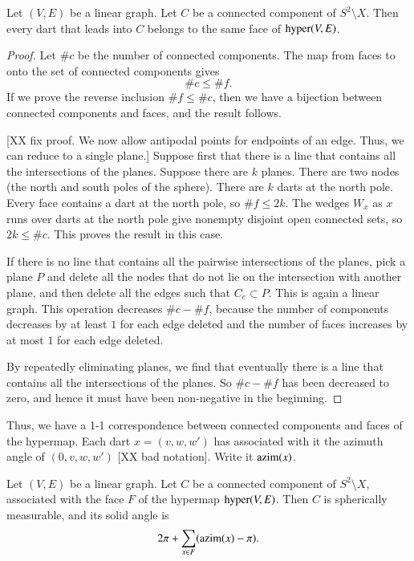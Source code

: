 \begin{lemma}  Let $(V,E)$ be a linear graph.  Let $C$ be a
connected component of $S^2\setminus X$.  Then every dart that leads
into $C$ belongs to the same face of ${\operatorname{hyper}}(V,E)$.
\end{lemma}

\begin{proof}  Let $\#c$ be the number of connected components.  The
map from faces to onto the set of connected components gives
        $$\#c \le \#f.$$
If we prove the reverse inclusion $\#f \le \#c$, then we have a
bijection between connected components and faces, and the result
follows.


[XX fix proof. We now allow antipodal points for endpoints of an
edge.  Thus, we can reduce to a single plane.] Suppose first that
there is a line that contains all the intersections of the planes.
Suppose there are $k$ planes. There are two nodes (the north and
south poles of the sphere). There are $k$ darts at the north pole.
Every face contains a dart at the north pole, so $\#f \le 2 k$. The
wedges $W_x$ as $x$ runs over darts at the north pole give nonempty
disjoint open connected sets, so $2 k \le \#c$.  This proves the
result in this case.

If there is no line that contains all the pairwise intersections of
the planes, pick a plane $P$ and delete all the nodes that do not
lie on the intersection with another plane, and then delete all the
edges such that $C_e\subset P$.  This is again a linear graph. This
operation decreases $\#c - \#f$, because the number of components
decreases by at least $1$ for each edge deleted and the number of
faces increases by at most $1$ for each edge deleted.

By repeatedly eliminating planes, we find that eventually there is a
line that contains all the intersections of the planes.  So $\#c -
\#f$ has been decreased to zero, and hence it must have been
non-negative in the beginning.
\end{proof}

Thus, we have a 1-1 correspondence between connected components and
faces of the hypermap.  Each dart $x=(v,w,w')$ has associated with
it the azimuth angle of $(0,v,w,w')$ [XX bad notation].  Write it
${\operatorname{azim}}(x)$.

\begin{lemma} Let $(V,E)$ be a linear graph.  Let $C$ be a connected
component of $S^2\setminus X$, associated with the face $F$ of the
hypermap ${\operatorname{hyper}}(V,E)$.    Then $C$ is spherically measurable,
and its solid angle  is
    $$2\pi + \sum_{x\in F} ({\operatorname{azim}}(x)-\pi).$$
\end{lemma}


